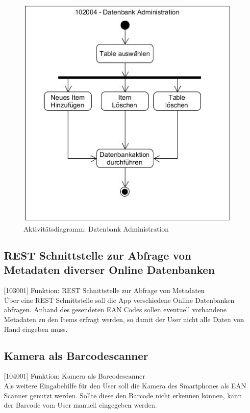 \begin{figure}[htbp]
	\centering
	\includegraphics[scale=0.6]{pic/102004}
	\caption{Aktivitätsdiagramm: Datenbank Administration}
\end{figure}

\subsection{REST Schnittstelle zur Abfrage von Metadaten diverser Online Datenbanken}

[103001] Funktion: REST Schnittstelle zur Abfrage von Metadaten\\

Über eine REST Schnittstelle soll die App verschiedene Online Datenbanken abfragen. Anhand des gesendeten EAN Codes sollen eventuell vorhandene Metadaten zu den Items erfragt werden, so damit der User nicht alle Daten von Hand eingeben muss.

\subsection{Kamera als Barcodescanner}

[104001] Funktion: Kamera als Barcodescanner\\

Als weitere Eingabehilfe für den User soll die Kamera des Smartphones als EAN Scanner genutzt werden. Sollte diese den Barcode nicht erkennen können, kann der Barcode vom User manuell eingegeben werden.
